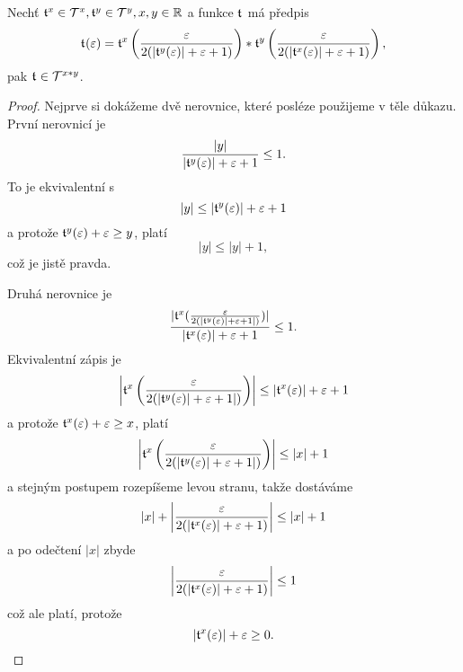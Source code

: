 \begin{theorem}\label{vet:soucin_dvou_tnumu}
Nechť $\mathfrak{t}^{x}\in\mathcal{T}^{x},\mathfrak{t}^{y}\in\mathcal{T}^{y},x,y\in\mathbb{R}$ a funkce $\mathfrak{t}^{}$ má předpis
\begin{equation}
\mathfrak{t}^{}(\varepsilon)=\mathfrak{t}^{x}\left(\frac{\varepsilon}{2(|\mathfrak{t}^{y}(\varepsilon)| + \varepsilon + 1)}\right)*\mathfrak{t}^{y}\left(\frac{\varepsilon}{2(|\mathfrak{t}^{x}(\varepsilon)| + \varepsilon + 1)}\right),
\end{equation}
pak $\mathfrak{t}^{}\in\mathcal{T}^{x*y}$.

\begin{proof}
Nejprve si dokážeme dvě nerovnice, které posléze použijeme v těle důkazu.
První nerovnicí je 
\begin{equation}\label{duk:soucin_prvni}
\frac{|y|}{|\mathfrak{t}^{y}(\varepsilon)| + \varepsilon + 1}\leq 1.
\end{equation}
To je ekvivalentní s
\begin{equation}
|y|\leq |\mathfrak{t}^{y}(\varepsilon)|+\varepsilon+1
\end{equation}
a protože $\mathfrak{t}^{y}(\varepsilon)+\varepsilon\geq y$, platí
\begin{equation}
|y|\leq |y|+1,
\end{equation}
což je jistě pravda. 

Druhá nerovnice je
\begin{equation}\label{duk:soucin_druha}
\frac{|\mathfrak{t}^{x}(\frac{\varepsilon}{2(|\mathfrak{t}^{y}(\varepsilon)|+\varepsilon+1|)})|}{|\mathfrak{t}^{x}(\varepsilon)|+\varepsilon+1}\leq 1.
\end{equation}
Ekvivalentní zápis je
\begin{equation}
\left|\mathfrak{t}^{x}\left(\frac{\varepsilon}{2(|\mathfrak{t}^{y}(\varepsilon)|+\varepsilon+1|)}\right)\right|\leq |\mathfrak{t}^{x}(\varepsilon)|+\varepsilon+1
\end{equation}
a protože $\mathfrak{t}^{x}(\varepsilon)+\varepsilon\geq x$, platí
\begin{equation}
\left|\mathfrak{t}^{x}\left(\frac{\varepsilon}{2(|\mathfrak{t}^{y}(\varepsilon)|+\varepsilon+1|)}\right)\right|\leq |x|+1
\end{equation}
a stejným postupem rozepíšeme levou stranu, takže dostáváme
\begin{equation}
|x|+\left|\frac{\varepsilon}{2(|\mathfrak{t}^{x}(\varepsilon)|+\varepsilon+1)}\right|\leq |x|+1
\end{equation}
a po odečtení $|x|$ zbyde
\begin{equation}
\left|\frac{\varepsilon}{2(|\mathfrak{t}^{x}(\varepsilon)|+\varepsilon+1)}\right|\leq 1
\end{equation}
což ale platí, protože
\begin{equation}
|\mathfrak{t}^{x} (\varepsilon)|+\varepsilon\geq 0.
\end{equation}


\end{proof}
\end{theorem}
